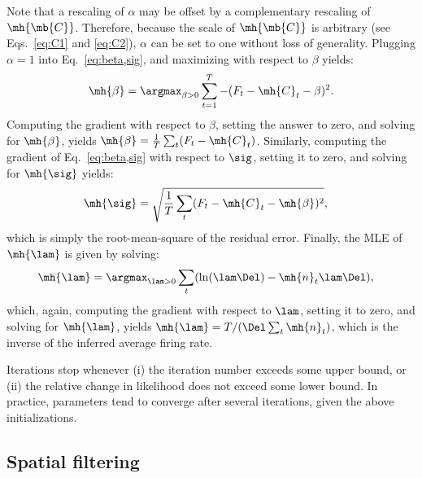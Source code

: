 Note that a rescaling of $\alpha$ may be offset by a complementary rescaling of $\mh{\mb{C}}$.  Therefore, because the scale of $\mh{\mb{C}}$ is arbitrary (see Eqs.~\eqref{eq:C1} and \eqref{eq:C2}), $\alpha$ can be set to one without loss of generality.  
Plugging $\alpha=1$ into Eq.~\eqref{eq:beta,sig}, and maximizing with respect to $\beta$ yields:
\begin{align}
\mh{\beta} = \argmax_{\beta>0} \sum_{t=1}^T -(F_t - \mh{C}_t - \beta)^2.
\end{align}
\noindent Computing the gradient with respect to $\beta$, setting the answer to zero, and solving for $\mh{\beta}$, yields $\mh{\beta} = \frac{1}{T} \sum_t (F_t-\mh{C}_t)$.  Similarly, computing the gradient of Eq.~\eqref{eq:beta,sig} with respect to $\sig$, setting it to zero, and solving for $\mh{\sig}$ yields:
\begin{align}
\mh{\sig} &= \sqrt{\frac{1}{T} \sum_t (F_t - \mh{C}_t - \mh{\beta})^2},
\end{align}
which is simply the root-mean-square of the residual error.  Finally, the MLE of $\mh{\lam}$ is given by solving:
\begin{align}
\mh{\lam} &= \argmax_{\lam>0} \sum_t (\ln (\lam \Del) - \mh{n}_t \lam \Del),
\end{align}
which, again, computing the gradient with respect to $\lam$, setting it to zero, and solving for $\mh{\lam}$, yields $\mh{\lam}=T/ (\Del \sum_t \mh{n}_t)$, which is the inverse of the inferred average firing rate.


Iterations stop whenever (i) the iteration number exceeds some upper bound, or (ii) the relative change in likelihood does not exceed some lower bound.  In practice, parameters tend to converge after several iterations, given the above initializations. 


\subsection{Spatial filtering} \label{sec:methods:spatial}

